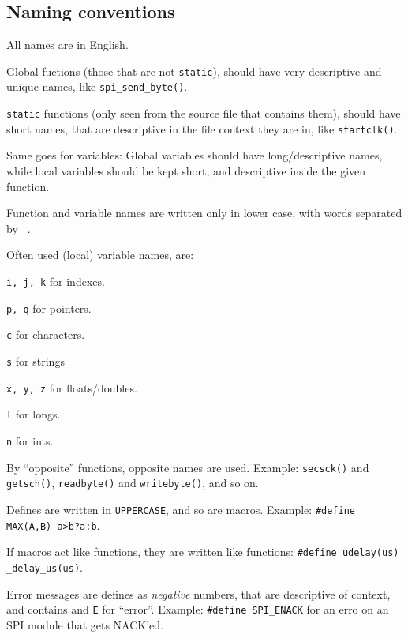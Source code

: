 \documentclass[article, 10pt]{memoir}
\let\tempone\itemize
\let\temptwo\enditemize
\renewenvironment{itemize}{\tempone\firmlist}{\temptwo}
\begin{document}
\begin{multicols}{2}
    \chapter{Naming conventions}
    \begin{itemize}
    \item All names are in English.
    \item Global fuctions (those that are not \texttt{static}), should have very descriptive and unique names, like \texttt{spi\_send\_byte()}.
    \item \texttt{static} functions (only seen from the source file that contains them), should have short names, that are descriptive in the file context they are in, like \texttt{startclk()}.
    \item Same goes for variables: Global variables should have long/descriptive names, while local variables should be kept short, and descriptive inside the given function.
    \item Function and variable names are written only in lower case, with words separated by \texttt{\_}.
    \item Often used (local) variable names, are:
        \begin{itemize}
        \item \texttt{i, j, k} for indexes.
        \item \texttt{p, q} for pointers.
        \item \texttt{c} for characters.
        \item \texttt{s} for strings
        \item \texttt{x, y, z} for floats/doubles.
        \item \texttt{l} for longs.
        \item \texttt{n} for ints.
        \end{itemize}
    \item By ``opposite'' functions, opposite names are used. Example: \texttt{secsck()} and \texttt{getsch()}, \texttt{readbyte()} and \texttt{writebyte()}, and so on.
    \item Defines are written in \texttt{UPPERCASE}, and so are macros. Example: \texttt{\#define MAX(A,B) a>b?a:b}. 

        If macros act like functions, they are written like functions: \texttt{\#define\ udelay(us) \_delay\_us(us)}.
    \item Error messages are defines as \emph{negative} numbers, that are descriptive of context, and contains and \texttt{E} for ``error''. Example: \texttt{\#define SPI\_ENACK} for an erro on an SPI module that gets NACK'ed.
    \end{itemize}


\end{multicols}
\end{document}
